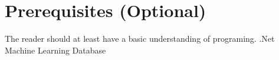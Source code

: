 \chapter*{Prerequisites (Optional)}
The reader should at least have a basic understanding of programing.
\newline
.Net
\newline
Machine Learning
\newline
Database
